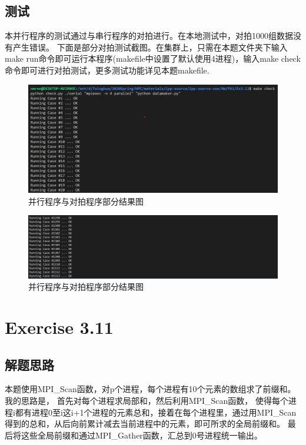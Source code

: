 \documentclass[UTF8]{article}
\begin{document}
\subsection{测试}
本并行程序的测试通过与串行程序的对拍进行。在本地测试中，对拍1000组数据没有产生错误。
下面是部分对拍测试截图。在集群上，只需在本题文件夹下输入make run命令即可运行本程序(makefile中设置了默认使用4进程)，输入make check命令即可进行对拍测试，更多测试功能详见本题makefile.

\begin{figure}[h]
    \centering
    \includegraphics[width=\textwidth]{checkResult.png}
    \caption{并行程序与对拍程序部分结果图}
\end{figure}

\begin{figure}[h]
    \centering
    \includegraphics[width=\textwidth]{checkResult1.png}
    \caption{并行程序与对拍程序部分结果图}
\end{figure}


\clearpage

 

\section{Exercise 3.11}
\subsection{解题思路}
本题使用MPI\_Scan函数，对p个进程，每个进程有10个元素的数组求了前缀和。我的思路是，
首先对每个进程求局部和，然后利用MPI\_Scan函数，
使得每个进程i都有进程0至i这i+1个进程的元素总和，接着在每个进程里，通过用MPI\_Scan
得到的总和，从后向前累计减去当前进程中的元素，即可所求的全局前缀和。
最后将这些全局前缀和通过MPI\_Gather函数，汇总到0号进程统一输出。
\end{document}
